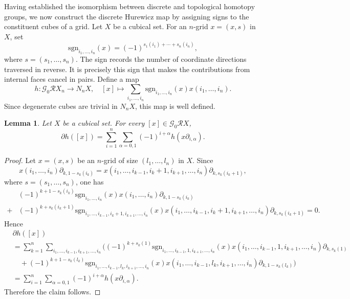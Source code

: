 \documentclass[oneside, 12pt]{amsart}
\numberwithin{equation}{section}
\theoremstyle{plain}
\newtheorem{lemma}[theorem]{Lemma}
\theoremstyle{definition}
\theoremstyle{remark}
\begin{document}
	Having established the isomorphism between discrete and topological homotopy groups, we now construct the discrete Hurewicz map by assigning signs to the constituent cubes of a grid. Let $X$ be a cubical set. For an $n$-grid $x=(x,s)$ in $X$, set
	\[
	\mathrm{sgn}_{i_1,\ldots,i_n}(x)=(-1)^{s_1(i_1)+\cdots+s_n(i_n)},
	\]
	where $s=(s_1,\ldots,s_n)$. The sign records the number of coordinate directions traversed in reverse. It is precisely this sign that makes the contributions from internal faces cancel in pairs. Define a map
	\[
	h\colon\mathcal{G}_0\mathcal{R}X_n\to N_nX,\quad[x]\mapsto\sum_{i_1,\ldots,i_n}\mathrm{sgn}_{i_1,\ldots,i_n}(x)x(i_1,\ldots,i_n).
	\]
	Since degenerate cubes are trivial in $N_nX$, this map is well defined.
	
	
	
	\begin{lemma}
		\label{Hurewicz map boundary}
		Let $X$ be a cubical set. For every $[x]\in\mathcal{G}_0\mathcal{R}X$,
		\[
		\partial h([x])=\sum_{i=1}^n\sum_{\alpha=0,1}(-1)^{i+\alpha}h(x\partial_{i,\alpha}).
		\]
	\end{lemma}
	
	\begin{proof}
		Let $x=(x,s)$ be an $n$-grid of size $(l_1,\ldots,l_n)$ in $X$. Since
		\[
		x(i_1,\ldots,i_n)\partial_{k,1-s_k(i_k)}=x(i_1,\ldots,i_{k-1},i_k+1,i_{k+1},\ldots,i_n)\partial_{k,s_k(i_k+1)},
		\]
		where $s=(s_1,\ldots,s_n)$, one has
		\begin{align*}
			&(-1)^{k+1-s_k(i_k)}\mathrm{sgn}_{i_1,\ldots,i_n}(x)x(i_1,\ldots,i_n)\partial_{k,1-s_k(i_k)}\\
			+&(-1)^{k+s_k(i_k+1)}\mathrm{sgn}_{i_1,\ldots,i_{k-1},i_k+1,i_{k+1},\ldots,i_n}(x)x(i_1,\ldots,i_{k-1},i_k+1,i_{k+1},\ldots,i_n)\partial_{k,s_k(i_k+1)}=0.
		\end{align*}
		Hence
		\begin{align*}
			&\partial h([x])\\
			&=\sum_{k=1}^n\sum_{i_1,\ldots,i_{k-1},i_{k+1},\ldots,i_n}((-1)^{k+s_k(1)}\mathrm{sgn}_{i_1,\ldots,i_{k-1},1,i_{k+1},\ldots,i_n}(x)x(i_1,\ldots,i_{k-1},1,i_{k+1},\ldots,i_n)\partial_{k,s_k(1)}\\
			&\quad+(-1)^{k+1-s_k(l_k)}\mathrm{sgn}_{i_1,\ldots,i_{k-1},l_k,i_{k+1},\ldots,i_n}(x)x(i_1,\ldots,i_{k-1},l_k,i_{k+1},\ldots,i_n)\partial_{k,1-s_k(l_k)})\\
			&=\sum_{i=1}^n\sum_{\alpha=0,1}(-1)^{i+\alpha}h(x\partial_{i,\alpha}).
		\end{align*}
		Therefore the claim follows.
	\end{proof}
	
\end{document}
